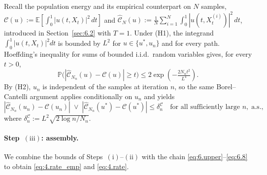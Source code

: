 \documentclass[11pt,leqno]{article}
\theoremstyle{plain}
\theoremstyle{remark}
\theoremstyle{definition}
\numberwithin{equation}{section}
\numberwithin{figure}{section}
\numberwithin{table}{section}
\numberwithin{algorithm}{section}
\newcommand{\EE}{\mathbb{E}}
\begin{document}
Recall the population energy and its empirical counterpart on $N$ samples,
$\mathcal{C}(u) := \EE[\int_0^1|u(t,X_t)|^2\,dt]$ and
$\hat{\mathcal{C}}_N(u) := \frac{1}{N}\sum_{i=1}^N\int_0^1|u(t,X_t^{(i)})|^2\,dt$,
introduced in Section~\ref{sec:6.2} with $T=1$.
Under (H1), the integrand $\int_0^1|u(t,X_t)|^2 dt$ is bounded by $L^2$ for $u\in\{u^*,u_n\}$ and for every path.
Hoeffding's inequality for sums of bounded i.i.d.\ random variables gives, for every $t>0$,
\[
 \mathbb{P}\bigl(|\hat{\mathcal{C}}_{N_n}(u) - \mathcal{C}(u)|\ge t\bigr)
 \le 2\exp\!\left(-\tfrac{2N_n t^2}{L^4}\right).
\]
By (H2), $u_n$ is independent of the samples at iteration $n$, so the same Borel--Cantelli argument applies conditionally on $u_n$ and yields
\begin{equation}\label{eq:6.energy_rate}
 |\hat{\mathcal{C}}_{N_n}(u_n) - \mathcal{C}(u_n)|\;\vee\;|\hat{\mathcal{C}}_{N_n}(u^*) - \mathcal{C}(u^*)|
 \le \delta^{\mathcal{C}}_n
 \quad\text{for all sufficiently large }n,\;\text{a.s.},
\end{equation}
where $\delta^{\mathcal{C}}_n := L^2\sqrt{2\log n/N_n}$.

\paragraph{Step~$(\mathrm{iii})$: assembly.}
We combine the bounds of Steps~$(\mathrm{i})$--$(\mathrm{ii})$ with the chain \eqref{eq:6.upper}--\eqref{eq:6.8}
to obtain \eqref{eq:4.rate_emp} and \eqref{eq:4.rate}.
\end{document}
